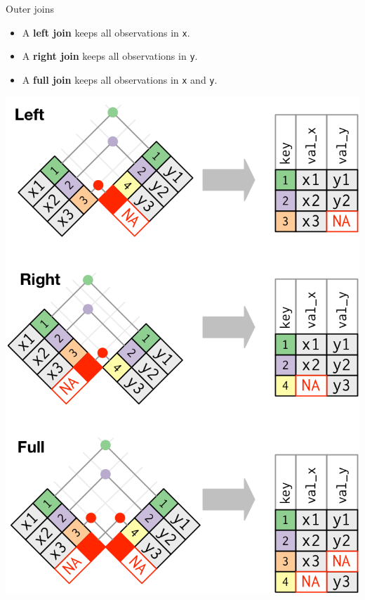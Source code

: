 \documentclass[14pt,ignorenonframetext,]{bredelebeamer}
\providecommand{\tightlist}{%
  \setlength{\itemsep}{0pt}\setlength{\parskip}{0pt}}
\begin{document}
\begin{frame}[fragile]{Outer joins}

\begin{itemize}
\tightlist
\item
  A \textbf{left join} keeps all observations in \texttt{x}.
\item
  A \textbf{right join} keeps all observations in \texttt{y}.
\item
  A \textbf{full join} keeps all observations in \texttt{x} and
  \texttt{y}.
\end{itemize}

\begin{center}\includegraphics[width=0.35\linewidth]{images/join-outer} \end{center}

\end{frame}
\end{document}
